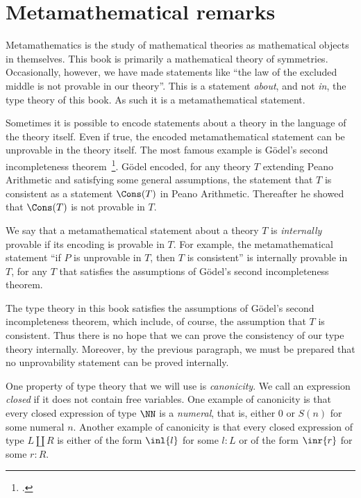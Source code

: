 \chapter{Metamathematical remarks}
\label{app:metamath}

Metamathematics is the study of mathematical theories as
mathematical objects in themselves.
This book is primarily a mathematical theory of symmetries.
Occasionally, however, we have made statements like
``the law of the excluded middle is not provable in our theory''.
This is a statement \emph{about}, and not \emph{in}, the type theory of this book.
As such it is a metamathematical statement.

Sometimes it is possible to encode statements
about a theory in the language of the theory itself.%
Even if true, the encoded metamathematical statement can 
be unprovable in the theory itself.
The most famous example is G\"{o}del's second incompleteness theorem~\footcite{Goedel2nd}.
G\"{o}del encoded, for any theory $T$ extending Peano Arithmetic and satisfying
some general assumptions, the statement that $T$ is consistent as
a statement $\Cons(T)$ in Peano Arithmetic. Thereafter he showed
that $\Cons(T)$ is not provable in $T$.

We say that a metamathematical statement about a theory $T$
is \emph{internally} provable if its encoding is provable in $T$.
For example, the metamathematical statement ``if $P$ is unprovable in $T$,
then $T$ is consistent'' is internally provable in $T$, for any $T$ that
satisfies the assumptions of G\"{o}del's second incompleteness theorem.

The type theory in this book satisfies the assumptions of
G\"{o}del's second incompleteness theorem, which include, of course,
the assumption that $T$ is consistent. Thus there is no hope
that we can prove the consistency of our type theory internally.
Moreover, by the previous paragraph, we must be prepared that
no unprovability statement can be proved internally.

One property of type theory that we will use is \emph{canonicity}.
We call an expression \emph{closed} if it does not contain free variables.
One example of canonicity is that every closed expression of type $\NN$
is a \emph{numeral}, that is, either $0$ or $S(n)$ for some numeral $n$.
Another example of canonicity is that every closed expression of 
type $L\coprod R$ is either of the form $\inl{l}$ for some $l:L$ or
of the form $\inr{r}$ for some $r:R$.

